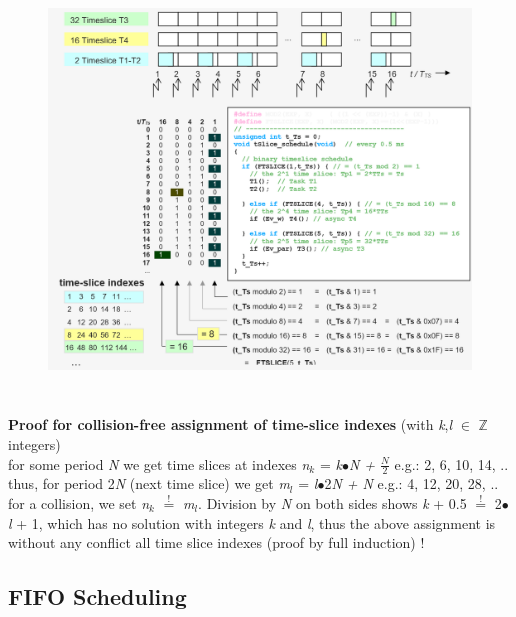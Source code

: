  
 	\begin{figure}[h]
    \centering
    \includegraphics[width=15cm, height=11cm]{Images/image96.png}
    \label{fig:Fig }
    \end{figure}

\textbf{Proof for collision-free assignment of time-slice indexes } (with \textit{k},\textit{l} $\in$ \textbf{$\boldsymbol{\mathbb{Z}}$}  integers)\\

for some period \textit{N} we get time slices at indexes  \textit{n${}_{k}$}  =  \textit{k$\bullet$N  +  $\frac{N}{2} $}  e.g.: 2, 6, 10, 14, ..\\

thus, for period 2\textit{N} (next time slice) we get    \textit{m${}_{l}$} =  \textit{l$\bullet$}2\textit{N  +  N  }e.g.: 4, 12, 20, 28, ..\\

for a collision, we set \textit{n${}_{k}$} ${\mathop{=}\limits^{!}} $ \textit{m${}_{l}$}. Division by \textit{N} on both sides shows \textit{k} + 0.5 ${\mathop{=}\limits^{!}} $ 2$\mathrm{\bullet}$\textit{l} + 1, which has no solution with integers \textit{k} and \textit{l}, thus the above assignment is without any conflict all time slice indexes (proof by full induction) !


\subsection{FIFO Scheduling}

